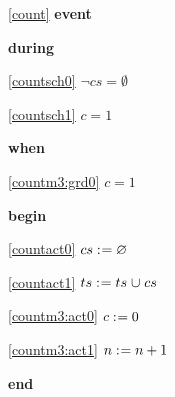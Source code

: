 \noindent \ref{count}  \textbf{event}
\begin{block}
  \item   \textbf{during}
  \begin{block}
  \item[ \eqref{countsch0} ]\sout{$\neg cs = \emptyset $} %
  \end{block}
  \begin{block}
  \item[ \eqref{countsch1} ]{$c = 1$} %
  \end{block}
  \item   \textbf{when}
  \begin{block}
  \item[ \eqref{countm3:grd0} ]{$c = 1$} %
  \end{block}
  \item   \textbf{begin}
  \begin{block}
  \item[ \eqref{countact0} ]\sout{$cs \mathrel{:\mkern1mu=} \mathord\varnothing$} %
  \item[ \eqref{countact1} ]\sout{$ts \mathrel{:\mkern1mu=} ts \mathbin{\mkern1mu\cup\mkern1mu} cs $} %
  \end{block}
  \begin{block}
  \item[ \eqref{countm3:act0} ]{$c \mathrel{:\mkern1mu=} 0$} %
  \item[ \eqref{countm3:act1} ]{$n \mathrel{:\mkern1mu=} n+1$} %
  \end{block}
  \item   \textbf{end} \\
\end{block}
